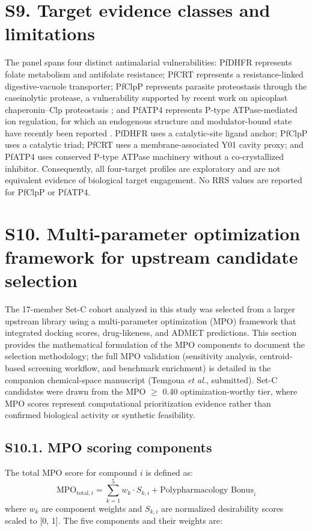 \documentclass[journal=jcisd8,manuscript=suppinfo]{achemso}
\begin{document}
\section*{S9. Target evidence classes and limitations}
The panel spans four distinct antimalarial vulnerabilities: PfDHFR represents folate metabolism and antifolate resistance; PfCRT represents a resistance-linked digestive-vacuole transporter; PfClpP represents parasite proteostasis through the caseinolytic protease, a vulnerability supported by recent work on apicoplast chaperonin--Clp proteostasis \cite{Tissawak2025}; and PfATP4 represents P-type ATPase-mediated ion regulation, for which an endogenous structure and modulator-bound state have recently been reported \cite{Haile2025}. PfDHFR uses a catalytic-site ligand anchor; PfClpP uses a catalytic triad; PfCRT uses a membrane-associated Y01 cavity proxy; and PfATP4 uses conserved P-type ATPase machinery without a co-crystallized inhibitor. Consequently, all four-target profiles are exploratory and are not equivalent evidence of biological target engagement. No RRS values are reported for PfClpP or PfATP4.

\section*{S10. Multi-parameter optimization framework for upstream candidate selection}
The 17-member Set-C cohort analyzed in this study was selected from a larger upstream library using a multi-parameter optimization (MPO) framework that integrated docking scores, drug-likeness, and ADMET predictions. This section provides the mathematical formulation of the MPO components to document the selection methodology; the full MPO validation (sensitivity analysis, centroid-based screening workflow, and benchmark enrichment) is detailed in the companion chemical-space manuscript (Temgoua \textit{et al.}, submitted). Set-C candidates were drawn from the MPO $\geq$ \num{0.40} optimization-worthy tier, where MPO scores represent computational prioritization evidence rather than confirmed biological activity or synthetic feasibility.

\subsection*{S10.1. MPO scoring components}
The total MPO score for compound $i$ is defined as:
\begin{equation}
\text{MPO}_{\text{total}, i} = \sum_{k=1}^{5} w_k \cdot S_{k,i} + \text{Polypharmacology Bonus}_i
\label{eq:sm_mpo_total}
\end{equation}
where $w_k$ are component weights and $S_{k,i}$ are normalized desirability scores scaled to [\num{0}, \num{1}]. The five components and their weights are:
\end{document}
